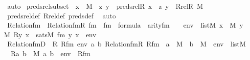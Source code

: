 \begin{isabellebody}
\ auto%
\endisatagproof
{\isafoldproof}%
%
\isadelimproof
\isanewline
%
\endisadelimproof
\isanewline
{}\isamarkupfalse%
\ preds{\isacharunderscore}{\kern0pt}rel{\isacharunderscore}{\kern0pt}subset{\isacharprime}{\kern0pt}\ {\isacharcolon}{\kern0pt}\ {\isachardoublequoteopen}x\ {\isasymin}\ M\ {\isasymLongrightarrow}\ {\isacharless}{\kern0pt}z{\isacharcomma}{\kern0pt}\ y{\isachargreater}{\kern0pt}\ {\isasymin}\ preds{\isacharunderscore}{\kern0pt}rel{\isacharparenleft}{\kern0pt}R{\isacharcomma}{\kern0pt}\ x{\isacharparenright}{\kern0pt}\ {\isasymLongrightarrow}\ {\isacharless}{\kern0pt}z{\isacharcomma}{\kern0pt}\ y{\isachargreater}{\kern0pt}\ {\isasymin}\ Rrel{\isacharparenleft}{\kern0pt}R{\isacharcomma}{\kern0pt}\ M{\isacharparenright}{\kern0pt}{\isachardoublequoteclose}\ \isanewline
%
\isadelimproof
\ \ %
\endisadelimproof
%
\isatagproof
{}\isamarkupfalse%
\ preds{\isacharunderscore}{\kern0pt}rel{\isacharunderscore}{\kern0pt}def\ Rrel{\isacharunderscore}{\kern0pt}def\ preds{\isacharunderscore}{\kern0pt}def\ \isamarkupfalse%
\ auto%
\endisatagproof
{\isafoldproof}%
%
\isadelimproof
\isanewline
%
\endisadelimproof
\isanewline
{}\isamarkupfalse%
\ Relation{\isacharunderscore}{\kern0pt}fm\ \ {\isachardoublequoteopen}Relation{\isacharunderscore}{\kern0pt}fm{\isacharparenleft}{\kern0pt}R{\isacharcomma}{\kern0pt}\ fm{\isacharparenright}{\kern0pt}\ {\isasymequiv}\ fm\ {\isasymin}\ formula\ {\isasymand}\ arity{\isacharparenleft}{\kern0pt}fm{\isacharparenright}{\kern0pt}\ {\isacharequal}{\kern0pt}\ {}\ {\isasymand}\ {\isacharparenleft}{\kern0pt}{\isasymforall}env\ {\isasymin}\ list{\isacharparenleft}{\kern0pt}M{\isacharparenright}{\kern0pt}{\isachardot}{\kern0pt}\ {\isasymforall}x\ {\isasymin}\ M{\isachardot}{\kern0pt}\ {\isasymforall}y\ {\isasymin}\ M{\isachardot}{\kern0pt}\ R{\isacharparenleft}{\kern0pt}y{\isacharcomma}{\kern0pt}\ x{\isacharparenright}{\kern0pt}\ {\isasymlongleftrightarrow}\ sats{\isacharparenleft}{\kern0pt}M{\isacharcomma}{\kern0pt}\ fm{\isacharcomma}{\kern0pt}\ {\isacharbrackleft}{\kern0pt}y{\isacharcomma}{\kern0pt}\ x{\isacharbrackright}{\kern0pt}\ {\isacharat}{\kern0pt}\ env{\isacharparenright}{\kern0pt}{\isacharparenright}{\kern0pt}{\isachardoublequoteclose}\ \isanewline
\isanewline
{}\isamarkupfalse%
\ Relation{\isacharunderscore}{\kern0pt}fmD\ {\isacharcolon}{\kern0pt}\ {\isachardoublequoteopen}{\isasymAnd}R\ Rfm\ env\ a\ b{\isachardot}{\kern0pt}\ Relation{\isacharunderscore}{\kern0pt}fm{\isacharparenleft}{\kern0pt}R{\isacharcomma}{\kern0pt}\ Rfm{\isacharparenright}{\kern0pt}\ {\isasymLongrightarrow}\ a\ {\isasymin}\ M\ {\isasymLongrightarrow}\ b\ {\isasymin}\ M\ {\isasymLongrightarrow}\ env\ {\isasymin}\ list{\isacharparenleft}{\kern0pt}M{\isacharparenright}{\kern0pt}\ {\isasymLongrightarrow}\ \ R{\isacharparenleft}{\kern0pt}a{\isacharcomma}{\kern0pt}\ b{\isacharparenright}{\kern0pt}\ {\isasymlongleftrightarrow}\ M{\isacharcomma}{\kern0pt}\ {\isacharbrackleft}{\kern0pt}a{\isacharcomma}{\kern0pt}\ b{\isacharbrackright}{\kern0pt}\ {\isacharat}{\kern0pt}\ env\ {\isasymTurnstile}\ Rfm{\isachardoublequoteclose}\ \isanewline

\end{isabellebody}
